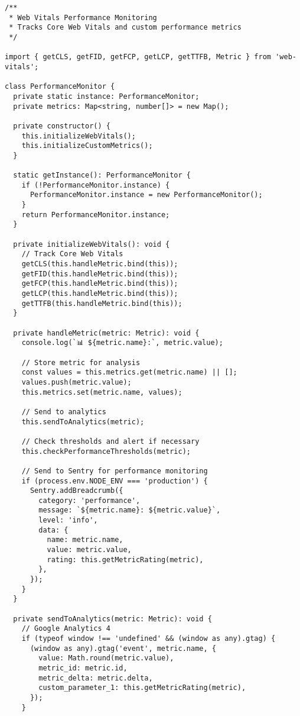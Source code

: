 \documentclass[11pt,a4paper]{article}
\begin{document}
\begin{lstlisting}[style=javascript, caption=Web Vitals Performance Monitoring]
/**
 * Web Vitals Performance Monitoring
 * Tracks Core Web Vitals and custom performance metrics
 */

import { getCLS, getFID, getFCP, getLCP, getTTFB, Metric } from 'web-vitals';

class PerformanceMonitor {
  private static instance: PerformanceMonitor;
  private metrics: Map<string, number[]> = new Map();
  
  private constructor() {
    this.initializeWebVitals();
    this.initializeCustomMetrics();
  }
  
  static getInstance(): PerformanceMonitor {
    if (!PerformanceMonitor.instance) {
      PerformanceMonitor.instance = new PerformanceMonitor();
    }
    return PerformanceMonitor.instance;
  }
  
  private initializeWebVitals(): void {
    // Track Core Web Vitals
    getCLS(this.handleMetric.bind(this));
    getFID(this.handleMetric.bind(this));
    getFCP(this.handleMetric.bind(this));
    getLCP(this.handleMetric.bind(this));
    getTTFB(this.handleMetric.bind(this));
  }
  
  private handleMetric(metric: Metric): void {
    console.log(`📊 ${metric.name}:`, metric.value);
    
    // Store metric for analysis
    const values = this.metrics.get(metric.name) || [];
    values.push(metric.value);
    this.metrics.set(metric.name, values);
    
    // Send to analytics
    this.sendToAnalytics(metric);
    
    // Check thresholds and alert if necessary
    this.checkPerformanceThresholds(metric);
    
    // Send to Sentry for performance monitoring
    if (process.env.NODE_ENV === 'production') {
      Sentry.addBreadcrumb({
        category: 'performance',
        message: `${metric.name}: ${metric.value}`,
        level: 'info',
        data: {
          name: metric.name,
          value: metric.value,
          rating: this.getMetricRating(metric),
        },
      });
    }
  }
  
  private sendToAnalytics(metric: Metric): void {
    // Google Analytics 4
    if (typeof window !== 'undefined' && (window as any).gtag) {
      (window as any).gtag('event', metric.name, {
        value: Math.round(metric.value),
        metric_id: metric.id,
        metric_delta: metric.delta,
        custom_parameter_1: this.getMetricRating(metric),
      });
    }
    

\end{lstlisting}
\end{document}
